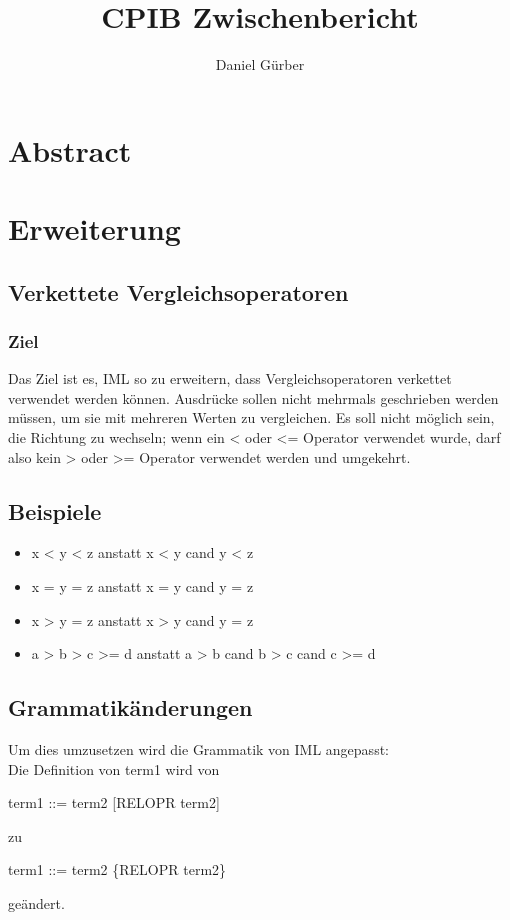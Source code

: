 \documentclass[a4paper,10pt]{article}
\title{CPIB Zwischenbericht}
\author{Daniel G\"urber}
\begin{document}
\maketitle
\newpage
\tableofcontents
\newpage

\section{Abstract}
\section{Erweiterung}
\subsection{Verkettete Vergleichsoperatoren}
\subsubsection{Ziel}
Das Ziel ist es, IML so zu erweitern, dass Vergleichsoperatoren verkettet verwendet werden k\"onnen. Ausdr\"ucke sollen nicht mehrmals
geschrieben werden m\"ussen, um sie mit mehreren Werten zu vergleichen. Es soll nicht m\"oglich sein, die Richtung zu wechseln; wenn ein < oder <= Operator verwendet wurde, darf also kein > oder >=
Operator verwendet werden und umgekehrt.
\subsection{Beispiele}
\begin{itemize}
\item x < y < z anstatt x < y cand y < z
\item x = y = z anstatt x = y cand y = z
\item x > y = z anstatt x > y cand y = z
\item a > b > c >= d anstatt a > b cand b > c cand c >= d
\end{itemize}
\subsection{Grammatik\"anderungen}
Um dies umzusetzen wird die Grammatik von IML angepasst:\\
Die Definition von term1 wird von
\begin{tabbing}
term1 ::= term2 [RELOPR term2]
\end{tabbing}
zu
\begin{tabbing}
term1 ::= term2 \{RELOPR term2\}
\end{tabbing}
ge\"andert.
\end{document}
